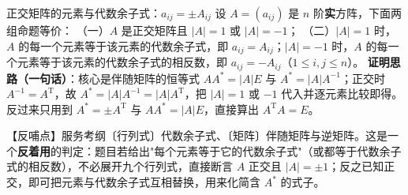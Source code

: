 \begin{fdeep}{正交矩阵的元素与代数余子式：$a_{ij}=\pm A_{ij}$}
设 $A=(a_{ij})$ 是 $n$ 阶\textbf{实}方阵，下面两组命题等价：
（一）$A$ 是正交矩阵且 $|A|=1$ 或 $|A|=-1$；
（二）$|A|=1$ 时，$A$ 的每一个元素等于该元素的代数余子式，即 $a_{ij}=A_{ij}$；$|A|=-1$ 时，$A$ 的每一个元素等于该元素的代数余子式的相反数，即 $a_{ij}=-A_{ij}$（$1\le i,j\le n$）。
\textbf{证明思路（一句话）}：核心是伴随矩阵的恒等式 $AA^{*}=|A|E$ 与 $A^{*}=|A|A^{-1}$；正交时 $A^{-1}=A^{\mathrm T}$，故 $A^{*}=|A|A^{-1}=|A|A^{\mathrm T}$，把 $|A|=1$ 或 $-1$ 代入并逐元素比较即得。反过来只用到 $A^{*}=\pm A^{\mathrm T}$ 与 $AA^{*}=|A|E$，直接算出 $A^{\mathrm T}A=E$。

【反哺点】服务考纲〔行列式〕代数余子式、〔矩阵〕伴随矩阵与逆矩阵。这是一个\textbf{反着用}的判定：题目若给出"每个元素等于它的代数余子式"（或都等于代数余子式的相反数），不必展开九个行列式，直接断言 $A$ 正交且 $|A|=\pm1$；反之已知正交，即可把元素与代数余子式互相替换，用来化简含 $A^{*}$ 的式子。
\end{fdeep}


